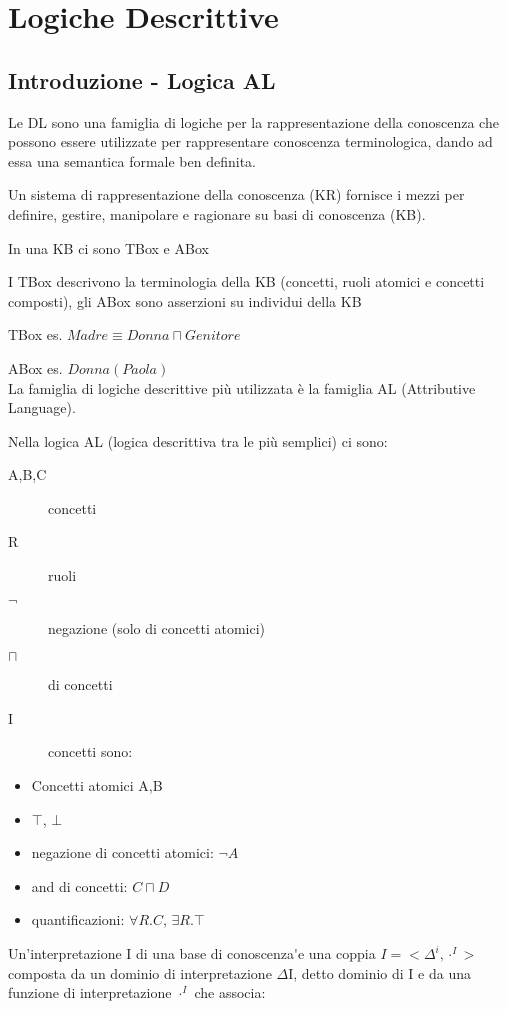
\chapter{Logiche Descrittive	}


\section{Introduzione - Logica AL}

Le DL sono una famiglia di logiche per la rappresentazione della conoscenza
che possono essere utilizzate per rappresentare conoscenza terminologica,
dando ad essa una semantica formale ben definita.

Un sistema di rappresentazione della conoscenza (KR) fornisce i mezzi
per definire, gestire, manipolare e ragionare su basi di conoscenza
(KB).

In una KB ci sono TBox e ABox

I TBox descrivono la terminologia della KB (concetti, ruoli atomici
e concetti composti), gli ABox sono asserzioni su individui della
KB

TBox es. $Madre\equiv Donna\sqcap Genitore$

ABox es. $Donna(Paola)$\\


La famiglia di logiche descrittive più utilizzata è la famiglia AL
(Attributive Language).

Nella logica AL (logica descrittiva tra le più semplici) ci sono:
\begin{description}
\item [{A,B,C}] concetti
\item [{R}] ruoli
\item [{		$\neg$}] negazione (solo di concetti atomici)
\item [{$\sqcap$}] di concetti
\item [{\textmd{I}}] concetti sono:\end{description}
\begin{itemize}
\item Concetti atomici A,B
\item $\top$, $\bot$
\item negazione di concetti atomici: $\neg A$
\item and di concetti: $C\sqcap D$
\item quantificazioni: $\forall R.C$, $\exists R.\top$
\end{itemize}
Un'interpretazione I di una base di conoscenza\'{ }e una coppia $I=<\Delta^{i},\cdot^{I}>$
composta da un dominio di interpretazione $\Delta$I, detto dominio
di I e da una funzione di interpretazione $\cdot^{I}$ che associa:

